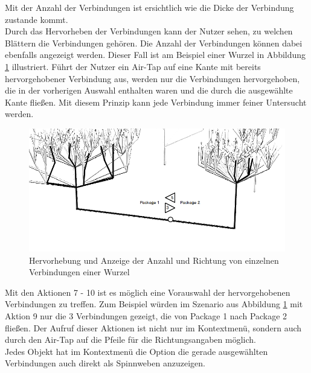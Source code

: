 \noindent Mit der Anzahl der Verbindungen ist ersichtlich wie die Dicke der Verbindung zustande kommt.\\

\noindent Durch das Hervorheben der Verbindungen kann der Nutzer sehen, zu welchen Blättern die Verbindungen gehören. Die Anzahl der Verbindungen können dabei ebenfalls angezeigt werden. Dieser Fall ist am Beispiel einer Wurzel in Abbildung \ref{fig:root-interaction} illustriert. Führt der Nutzer ein Air-Tap auf eine Kante mit bereits hervorgehobener Verbindung aus, werden nur die Verbindungen hervorgehoben, die in der vorherigen Auswahl enthalten waren und die durch die ausgewählte Kante fließen. Mit diesem Prinzip kann jede Verbindung immer feiner Untersucht werden.\\

\begin{figure}[htb]
  \includegraphics[width=\textwidth]{figures/root-interaction}
  \caption{Hervorhebung und Anzeige der Anzahl und Richtung von einzelnen Verbindungen einer Wurzel}
  \label{fig:root-interaction}
\end{figure}

\noindent Mit den Aktionen 7 - 10 ist es möglich eine Vorauswahl der hervorgehobenen Verbindungen zu treffen. Zum Beispiel würden im Szenario aus Abbildung \ref{fig:root-interaction} mit Aktion 9 nur die 3 Verbindungen gezeigt, die von Package 1 nach Package 2 fließen. Der Aufruf dieser Aktionen ist nicht nur im Kontextmenü, sondern auch durch den Air-Tap auf die Pfeile für die Richtungsangaben möglich. \\

\noindent Jedes Objekt hat im Kontextmenü die Option die gerade ausgewählten Verbindungen auch direkt als Spinnweben anzuzeigen.\\

